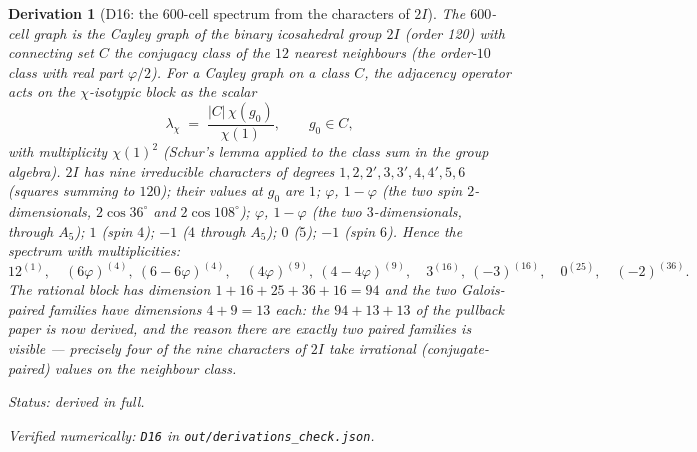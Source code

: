 \documentclass[11pt]{article}
\newtheorem{deriv}{Derivation}
\theoremstyle{remark}
\newcommand{\bucket}[1]{\par\smallskip\noindent\textit{Status: #1.}}
\newcommand{\chk}[1]{\par\noindent\textit{Verified numerically:
\texttt{#1} in \texttt{out/derivations\_check.json}.}}
\begin{document}
\begin{deriv}[D16: the 600-cell spectrum from the characters of
$2I$]\label{d16}
The $600$-cell graph is the Cayley graph of the binary icosahedral
group $2I$ (order 120) with connecting set $C$ the conjugacy class of
the $12$ nearest neighbours (the order-$10$ class with real part
$\varphi/2$). For a Cayley graph on a class $C$, the adjacency operator
acts on the $\chi$-isotypic block as the scalar
\[
\lambda_\chi \;=\; \frac{|C|\,\chi(g_0)}{\chi(1)},
\qquad g_0 \in C,
\]
with multiplicity $\chi(1)^2$ (Schur's lemma applied to the class sum
in the group algebra). $2I$ has nine irreducible characters of degrees
$1, 2, 2', 3, 3', 4, 4', 5, 6$ (squares summing to $120$); their values
at $g_0$ are $1$; $\varphi$, $1{-}\varphi$ (the two spin
$2$-dimensionals, $2\cos 36^\circ$ and $2\cos 108^\circ$); $\varphi$,
$1{-}\varphi$ (the two $3$-dimensionals, through $A_5$); $1$ (spin
$4$); $-1$ ($4$ through $A_5$); $0$ ($5$); $-1$ (spin $6$). Hence the
spectrum with multiplicities:
\[
12^{(1)},\quad (6\varphi)^{(4)},\ (6{-}6\varphi)^{(4)},\quad
(4\varphi)^{(9)},\ (4{-}4\varphi)^{(9)},\quad
3^{(16)},\ (-3)^{(16)},\quad 0^{(25)},\quad (-2)^{(36)}.
\]
The rational block has dimension $1{+}16{+}25{+}36{+}16 = 94$ and the
two Galois-paired families have dimensions $4{+}9 = 13$ each: the
$94 + 13 + 13$ of the pullback paper is now \emph{derived}, and the
reason there are exactly two paired families is visible --- precisely
four of the nine characters of $2I$ take irrational (conjugate-paired)
values on the neighbour class.
\bucket{derived in full}\chk{D16}
\end{deriv}
\end{document}
